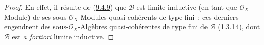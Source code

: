 \begin{proof}
En effet, il résulte de (\hyperref[I.9.4.9-fr]{9.4.9}) que $\mathscr{B}$
est limite inductive (en tant que $\mathscr{O}_X$-Module) de ses
sous-$\mathscr{O}_X$-Modules quasi-cohérents de type fini~; ces derniers
engendrent des sous-$\mathscr{O}_X$-Algèbres quasi-cohérentes de type fini
de $\mathscr{B}$ (\hyperref[I.1.3.14-fr]{1.3.14}), dont $\mathscr{B}$ est
\emph{a fortiori} limite inductive.
\end{proof}
